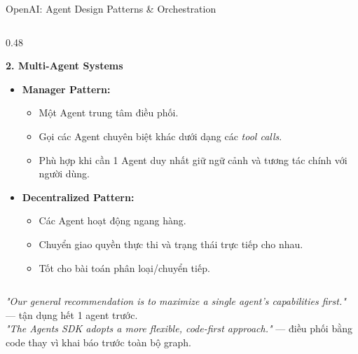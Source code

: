 \documentclass[aspectratio=1610,10pt,xcolor={table}]{beamer}
\begin{document}
\begin{frame}{OpenAI: Agent Design Patterns \& Orchestration}
\begin{columns}[t]
    \begin{column}{0.48\textwidth}
      \begin{alertblock}{\textbf{2. Multi-Agent Systems}}
        \scriptsize
        \begin{itemize}\scriptsize
          \item \textbf{Manager Pattern:}
            \begin{itemize}\scriptsize
              \item Một Agent trung tâm điều phối.
              \item Gọi các Agent chuyên biệt khác dưới dạng các \textit{tool calls}.
              \item Phù hợp khi cần 1 Agent duy nhất giữ ngữ cảnh và tương tác chính với người dùng.
            \end{itemize}
          \item \textbf{Decentralized Pattern:}
            \begin{itemize}\scriptsize
              \item Các Agent hoạt động ngang hàng.
              \item Chuyển giao quyền thực thi và trạng thái trực tiếp cho nhau.
              \item Tốt cho bài toán phân loại/chuyển tiếp.
            \end{itemize}
        \end{itemize}
      \end{alertblock}
    \end{column}
  \end{columns}

  \vspace{0.05cm}
  \begin{tcolorbox}[colback=boxbg,colframe=hcmutblue,title={\textbf{Nguyên Tắc Thiết Kế Cốt Lõi Từ OpenAI}},fonttitle=\footnotesize\bfseries]
    \scriptsize
    \textit{"Our general recommendation is to maximize a single agent's capabilities first."} — tận dụng hết 1 agent trước.\\
    \textit{"The Agents SDK adopts a more flexible, code-first approach."} — điều phối bằng code thay vì khai báo trước toàn bộ graph.
  \end{tcolorbox}
\end{frame}
\end{document}
